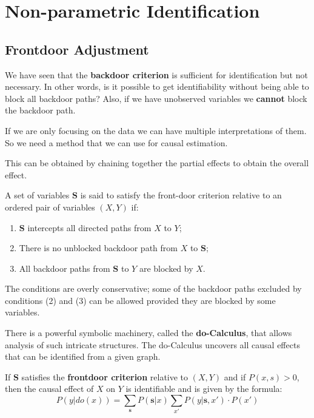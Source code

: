 \chapter{Non-parametric Identification}
\section{Frontdoor Adjustment}
We have seen that the \textbf{backdoor criterion} is sufficient for identification
but not necessary. In other words, is it possible to get identifiability without
being able to block all backdoor paths? Also, if we have unobserved variables we
\textbf{cannot} block the backdoor path.

If we are only focusing on the data we can have multiple interpretations of them.
So we need a method that we can use for causal estimation.

This can be obtained by chaining together the partial effects to obtain the overall effect.
\begin{definition}
    A set of variables $\mathbf{S}$ is said to satisfy the front-door criterion
    relative to an ordered pair of variables $(X, Y)$ if:
    \begin{enumerate}
        \item $\mathbf{S}$ intercepts all directed paths from $X$ to $Y$;
        \item There is no unblocked backdoor path from $X$ to $\mathbf{S}$;
        \item All backdoor paths from $\mathbf{S}$ to $Y$ are blocked by $X$.
    \end{enumerate}
\end{definition}
The conditions are overly conservative; some of the backdoor paths excluded by
conditions (2) and (3) can be allowed provided they are blocked by some
variables.

There is a powerful symbolic machinery, called the \textbf{do-Calculus}, that allows
analysis of such intricate structures. The do-Calculus uncovers all causal
effects that can be identified from a given graph.

\begin{definition}
    If $\mathbf{S}$ satisfies the \textbf{frontdoor criterion} relative to $(X, Y)$
    and if $P(x, s) > 0$, then the causal effect of $X$ on $Y$ is identifiable
    and is given by the formula:
    \begin{equation}
        P(y | do(x)) = \sum_{\mathbf{s}} P(\mathbf{s} | x) \sum_{x'} P(y | \mathbf{s}, x') \cdot P(x')
    \end{equation}
\end{definition}


